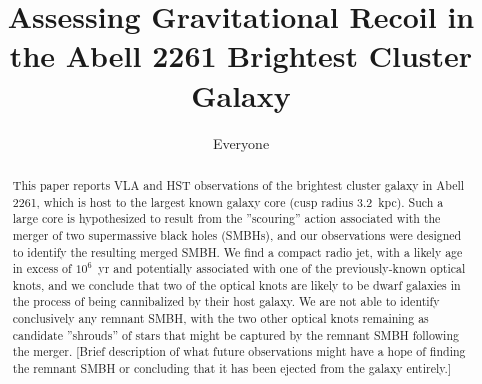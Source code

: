 \documentclass[useAMS,usenatbib]{emulateapj}
\newcommand{\src}{BCG\,2261}
\newcommand{\fixme}[1]{{\color{red} #1 }}
\begin{document}
 

\title{Assessing Gravitational Recoil in the Abell 2261 Brightest Cluster Galaxy}


\author{Everyone}


\begin{abstract}
\fixme{This paper reports VLA and HST observations of the brightest cluster galaxy in Abell 2261, which is host to the largest known galaxy core (cusp radius 3.2~kpc).  Such a large core is hypothesized to result from the ''scouring'' action associated with the merger of two supermassive black holes (SMBHs), and our observations were designed to identify the resulting merged SMBH.  We find a compact radio jet, with a likely age in excess of $10^6$~yr and potentially associated with one of the previously-known optical knots, and we conclude that two of the optical knots are likely to be dwarf galaxies in the process of being cannibalized by their host galaxy.  We are not able to identify conclusively any remnant SMBH, with the two other optical knots remaining as candidate ''shrouds'' of stars that might be captured by the remnant SMBH following the merger.  [Brief description of what future observations might have a hope of finding the remnant SMBH or concluding that it has been ejected from the galaxy entirely.]}
\end{abstract}
\end{document}
